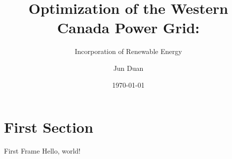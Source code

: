 \documentclass{beamer}
\title[Incorporation of Renewable Energy]{Optimization of the Western Canada Power Grid:}
\subtitle{Incorporation of Renewable Energy}
\date{\today}
\author{Jun Duan}
\institute{University of Victoria}
\begin{document}
  \maketitle
  \section{First Section}
  \begin{frame}{First Frame}
    Hello, world!
  \end{frame}
\end{document}
